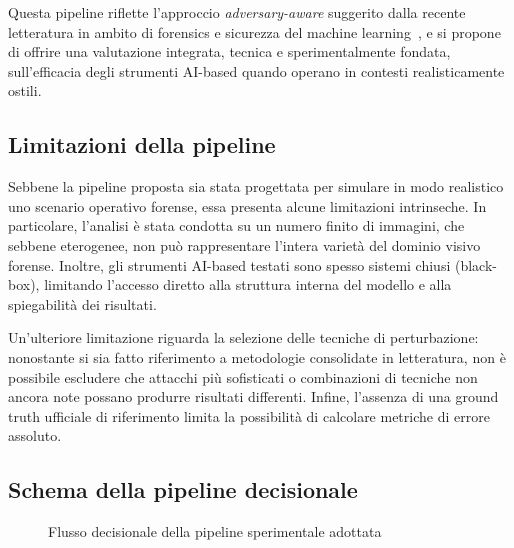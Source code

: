 Questa pipeline riflette l'approccio \textit{adversary-aware} suggerito dalla recente letteratura in ambito di forensics e sicurezza del machine learning~\cite{costantini2019digital}, e si propone di offrire una valutazione integrata, tecnica e sperimentalmente fondata, sull'efficacia degli strumenti AI-based quando operano in contesti realisticamente ostili.

\subsection*{Limitazioni della pipeline}

Sebbene la pipeline proposta sia stata progettata per simulare in modo realistico uno scenario operativo forense, essa presenta alcune limitazioni intrinseche. In particolare, l'analisi è stata condotta su un numero finito di immagini, che sebbene eterogenee, non può rappresentare l'intera varietà del dominio visivo forense. Inoltre, gli strumenti AI-based testati sono spesso sistemi chiusi (black-box), limitando l'accesso diretto alla struttura interna del modello e alla spiegabilità dei risultati.

Un'ulteriore limitazione riguarda la selezione delle tecniche di perturbazione: nonostante si sia fatto riferimento a metodologie consolidate in letteratura, non è possibile escludere che attacchi più sofisticati o combinazioni di tecniche non ancora note possano produrre risultati differenti. Infine, l'assenza di una ground truth ufficiale di riferimento limita la possibilità di calcolare metriche di errore assoluto.

\subsection*{Schema della pipeline decisionale}

\begin{figure}[H]
\centering
{}
\caption{Flusso decisionale della pipeline sperimentale adottata}
\label{fig:flow_pipeline}
\end{figure}



